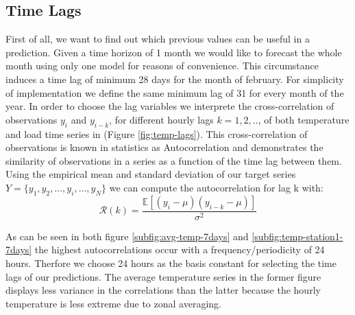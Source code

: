 \documentclass[conference]{IEEEtran}
\begin{document}
\subsection{Time Lags}
First of all, we want to find out which previous values can be useful in a prediction. Given a time horizon of 1 month we would like to forecast the whole month using only one model for reasons of convenience. This circumstance induces a time lag of minimum 28 days for the month of february. For simplicity of implementation we define the same minimum lag of 31 for every month of the year.   
In order to choose the lag variables we interprete the cross-correlation of observations $y_i$ and $y_{i-k}$, for different hourly lags $k=1,2,..$, of both temperature and load time series in (Figure \ref{fig:temp-lags}).
This cross-correlation of observations is known in statistics as Autocorrelation and demonstrates the similarity of observations in a series as a function of the time lag between them.
Using the empirical mean and standard deviation of our target series $Y=\{y_1, y_2, \dots, y_i, \dots, y_N\}$ we can compute the autocorrelation for lag k with:
\[
  \mathcal{R}(k)=\frac{\mathbb{E}\left[(y_i-\mu)(y_{i-k}-\mu)\right]}{\sigma^2}
\]

As can be seen in both figure \ref{subfig:avg-temp-7days} and \ref{subfig:temp-station1-7days} the highest autocorrelations occur with a frequency/periodicity of 24 hours. Therfore we choose 24 hours as the basis constant for selecting the time lags of our predictions. The average temperature series in the former figure displays less variance in the correlations than the latter because the hourly temperature is less extreme due to zonal averaging. 
\end{document}
